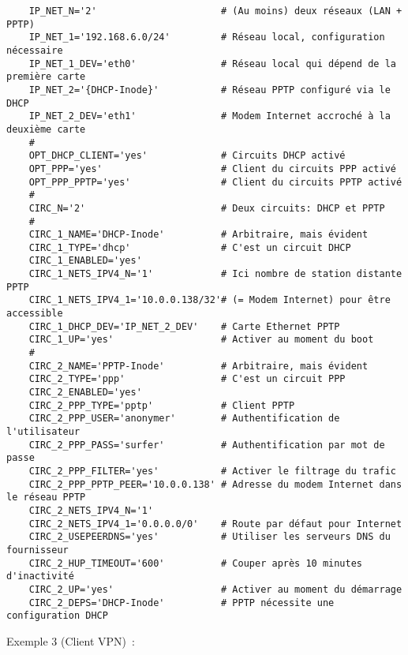 \begin{example}
\begin{verbatim}
    IP_NET_N='2'                      # (Au moins) deux réseaux (LAN + PPTP)
    IP_NET_1='192.168.6.0/24'         # Réseau local, configuration nécessaire
    IP_NET_1_DEV='eth0'               # Réseau local qui dépend de la première carte
    IP_NET_2='{DHCP-Inode}'           # Réseau PPTP configuré via le DHCP
    IP_NET_2_DEV='eth1'               # Modem Internet accroché à la deuxième carte
    #
    OPT_DHCP_CLIENT='yes'             # Circuits DHCP activé
    OPT_PPP='yes'                     # Client du circuits PPP activé
    OPT_PPP_PPTP='yes'                # Client du circuits PPTP activé
    #
    CIRC_N='2'                        # Deux circuits: DHCP et PPTP
    #
    CIRC_1_NAME='DHCP-Inode'          # Arbitraire, mais évident
    CIRC_1_TYPE='dhcp'                # C'est un circuit DHCP
    CIRC_1_ENABLED='yes'
    CIRC_1_NETS_IPV4_N='1'            # Ici nombre de station distante PPTP
    CIRC_1_NETS_IPV4_1='10.0.0.138/32'# (= Modem Internet) pour être accessible
    CIRC_1_DHCP_DEV='IP_NET_2_DEV'    # Carte Ethernet PPTP
    CIRC_1_UP='yes'                   # Activer au moment du boot
    #
    CIRC_2_NAME='PPTP-Inode'          # Arbitraire, mais évident
    CIRC_2_TYPE='ppp'                 # C'est un circuit PPP
    CIRC_2_ENABLED='yes'
    CIRC_2_PPP_TYPE='pptp'            # Client PPTP
    CIRC_2_PPP_USER='anonymer'        # Authentification de l'utilisateur
    CIRC_2_PPP_PASS='surfer'          # Authentification par mot de passe
    CIRC_2_PPP_FILTER='yes'           # Activer le filtrage du trafic
    CIRC_2_PPP_PPTP_PEER='10.0.0.138' # Adresse du modem Internet dans le réseau PPTP
    CIRC_2_NETS_IPV4_N='1'
    CIRC_2_NETS_IPV4_1='0.0.0.0/0'    # Route par défaut pour Internet
    CIRC_2_USEPEERDNS='yes'           # Utiliser les serveurs DNS du fournisseur
    CIRC_2_HUP_TIMEOUT='600'          # Couper après 10 minutes d'inactivité
    CIRC_2_UP='yes'                   # Activer au moment du démarrage
    CIRC_2_DEPS='DHCP-Inode'          # PPTP nécessite une configuration DHCP
\end{verbatim}
\end{example}

\noindent
Exemple 3 (Client VPN)~:

